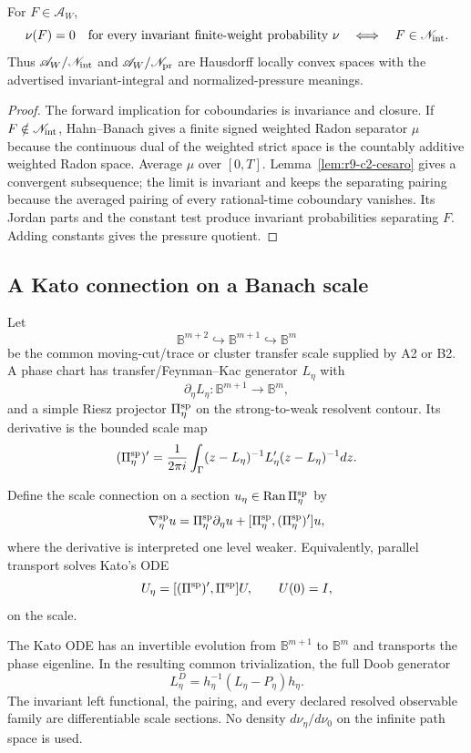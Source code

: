\begin{theorem}
\label{thm:r9-c2-null}
For $F\in\mathscr A_W$,
\[
 \nu(F)=0\quad\text{for every invariant finite-weight probability }\nu
 \quad\Longleftrightarrow\quad
 F\in\mathscr N_{\rm int}.
\]
Thus $\mathscr A_W/\mathscr N_{\rm int}$ and
$\mathscr A_W/\mathscr N_{\rm pr}$ are Hausdorff locally convex spaces with
the advertised invariant-integral and normalized-pressure meanings.
\end{theorem}

\begin{proof}
The forward implication for coboundaries is invariance and closure.  If
$F\notin\mathscr N_{\rm int}$, Hahn--Banach gives a finite signed weighted
Radon separator $\mu$ because the continuous dual of the weighted strict
space is the countably additive weighted Radon space.  Average $\mu$ over
$[0,T]$.  Lemma~\ref{lem:r9-c2-cesaro} gives a convergent subsequence; the
limit is invariant and keeps the separating pairing because the averaged
pairing of every rational-time coboundary vanishes.  Its Jordan parts and the
constant test produce invariant probabilities separating $F$.  Adding
constants gives the pressure quotient.
\end{proof}

\subsection{A Kato connection on a Banach scale}

Let
\[
 \mathbb B^{m+2}\hookrightarrow\mathbb B^{m+1}
 \hookrightarrow\mathbb B^{m}
\]
be the common moving-cut/trace or cluster transfer scale supplied by A2 or B2.
A phase chart has transfer/Feynman--Kac generator $L_\eta$ with
\[
 \partial_\eta L_\eta:
 \mathbb B^{m+1}\longrightarrow\mathbb B^{m},
\]
and a simple Riesz projector $\Pi_\eta^{\rm sp}$ on the strong-to-weak
resolvent contour.  Its derivative is the bounded scale map
\[
 (\Pi_\eta^{\rm sp})'
 =\frac1{2\pi i}\int_\Gamma
 (z-L_\eta)^{-1}L_\eta'(z-L_\eta)^{-1}dz.
\]

Define the scale connection on a section $u_\eta\in\operatorname{Ran}
\Pi_\eta^{\rm sp}$ by
\[
 \nabla_\eta^{\rm sp}u
 =\Pi_\eta^{\rm sp}\partial_\eta u
 +[\Pi_\eta^{\rm sp},(\Pi_\eta^{\rm sp})']u,
\]
where the derivative is interpreted one level weaker.  Equivalently, parallel
transport solves Kato's ODE
\[
 U_\eta=[(\Pi^{\rm sp})',\Pi^{\rm sp}]U,
 \qquad U(0)=I,
\]
on the scale.

\begin{theorem}
\label{thm:r9-c2-kato}
The Kato ODE has an invertible evolution from $\mathbb B^{m+1}$ to
$\mathbb B^m$ and transports the phase eigenline.  In the resulting common
trivialization, the full Doob generator
\[
 L_\eta^D=h_\eta^{-1}
 (L_\eta-P_\eta)h_\eta.
\]
The invariant left functional, the pairing, and every declared resolved
observable family are differentiable scale sections.  No density
$d\nu_\eta/d\nu_0$ on the infinite path space is used.
\end{theorem}

